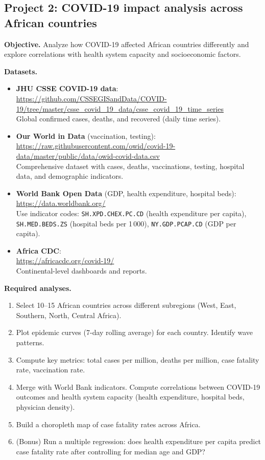 \subsection{Project 2: COVID-19 impact analysis across African countries}

\textbf{Objective.} Analyze how COVID-19 affected African countries differently and explore correlations with health system capacity and socioeconomic factors.

\textbf{Datasets.}
\begin{itemize}
  \item \textbf{JHU CSSE COVID-19 data}:\\
  \url{https://github.com/CSSEGISandData/COVID-19/tree/master/csse_covid_19_data/csse_covid_19_time_series}\\
  Global confirmed cases, deaths, and recovered (daily time series).
  \item \textbf{Our World in Data} (vaccination, testing):\\
  \url{https://raw.githubusercontent.com/owid/covid-19-data/master/public/data/owid-covid-data.csv}\\
  Comprehensive dataset with cases, deaths, vaccinations, testing, hospital data, and demographic indicators.
  \item \textbf{World Bank Open Data} (GDP, health expenditure, hospital beds):\\
  \url{https://data.worldbank.org/}\\
  Use indicator codes: \texttt{SH.XPD.CHEX.PC.CD} (health expenditure per capita), \texttt{SH.MED.BEDS.ZS} (hospital beds per 1\,000), \texttt{NY.GDP.PCAP.CD} (GDP per capita).
  \item \textbf{Africa CDC}:\\
  \url{https://africacdc.org/covid-19/}\\
  Continental-level dashboards and reports.
\end{itemize}

\textbf{Required analyses.}
\begin{enumerate}
  \item Select 10--15 African countries across different subregions (West, East, Southern, North, Central Africa).
  \item Plot epidemic curves (7-day rolling average) for each country. Identify wave patterns.
  \item Compute key metrics: total cases per million, deaths per million, case fatality rate, vaccination rate.
  \item Merge with World Bank indicators. Compute correlations between COVID-19 outcomes and health system capacity (health expenditure, hospital beds, physician density).
  \item Build a choropleth map of case fatality rates across Africa.
  \item (Bonus) Run a multiple regression: does health expenditure per capita predict case fatality rate after controlling for median age and GDP?
\end{enumerate}

